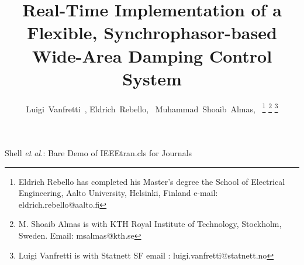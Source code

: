 \documentclass[journal]{IEEEtran}
\begin{document}
%
\title{Real-Time Implementation of a Flexible, Synchrophasor-based Wide-Area Damping Control System}
%
%
%


\author{Luigi~Vanfretti~, Eldrich~Rebello,~
        Muhammad~Shoaib~Almas,~
\thanks{Eldrich Rebello has completed his Master's degree the School of Electrical Engineering, Aalto University, Helsinki, Finland
e-mail:  \mbox{eldrich.rebello@aalto.fi}}%
\thanks{M. Shoaib Almas is with KTH Royal Institute of Technology, Stockholm, Sweden. Email: msalmas@kth.se}%
\thanks{Luigi Vanfretti is with Statnett SF email : luigi.vanfretti@statnett.no}}

% 
%



%
{Shell \MakeLowercase{\textit{et al.}}: Bare Demo of IEEEtran.cls for Journals}
% 
\end{document}
